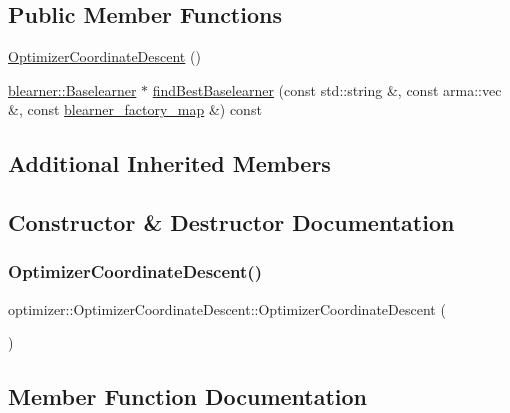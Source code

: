 \subsection*{Public Member Functions}
\begin{DoxyCompactItemize}
\item 
\mbox{\hyperlink{classoptimizer_1_1_optimizer_coordinate_descent_a5c525d14644774eeade27e1affece099}{Optimizer\+Coordinate\+Descent}} ()
\item 
\mbox{\hyperlink{classblearner_1_1_baselearner}{blearner\+::\+Baselearner}} $\ast$ \mbox{\hyperlink{classoptimizer_1_1_optimizer_coordinate_descent_af657f2f5f702bddab8c640368704d18c}{find\+Best\+Baselearner}} (const std\+::string \&, const arma\+::vec \&, const \mbox{\hyperlink{baselearner__factory__list_8h_a058570e00ae11b882cfed36eb40be025}{blearner\+\_\+factory\+\_\+map}} \&) const
\end{DoxyCompactItemize}
\subsection*{Additional Inherited Members}


\subsection{Constructor \& Destructor Documentation}
\mbox{\label{classoptimizer_1_1_optimizer_coordinate_descent_a5c525d14644774eeade27e1affece099}} 
\subsubsection{\texorpdfstring{Optimizer\+Coordinate\+Descent()}{OptimizerCoordinateDescent()}}
{\footnotesize\ttfamily optimizer\+::\+Optimizer\+Coordinate\+Descent\+::\+Optimizer\+Coordinate\+Descent (\begin{DoxyParamCaption}{ }\end{DoxyParamCaption})}



\subsection{Member Function Documentation}
\mbox{\label{classoptimizer_1_1_optimizer_coordinate_descent_af657f2f5f702bddab8c640368704d18c}} 

